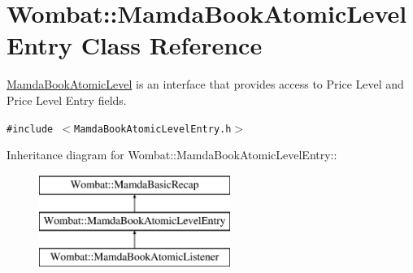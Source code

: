 \hypertarget{classWombat_1_1MamdaBookAtomicLevelEntry}{
\section{Wombat::Mamda\-Book\-Atomic\-Level\-Entry Class Reference}
\label{classWombat_1_1MamdaBookAtomicLevelEntry}
}
\hyperlink{classWombat_1_1MamdaBookAtomicLevel}{Mamda\-Book\-Atomic\-Level} is an interface that provides access to Price Level and Price Level Entry fields.  


{\tt \#include $<$Mamda\-Book\-Atomic\-Level\-Entry.h$>$}

Inheritance diagram for Wombat::Mamda\-Book\-Atomic\-Level\-Entry::\begin{figure}[H]
\begin{center}
\leavevmode
\includegraphics[height=3cm]{classWombat_1_1MamdaBookAtomicLevelEntry}
\end{center}
\end{figure}

